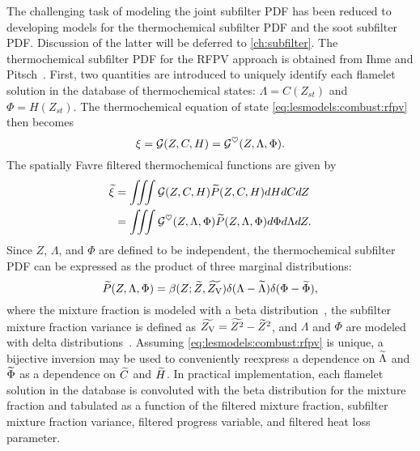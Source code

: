 The challenging task of modeling the joint subfilter PDF has been reduced to developing models for the thermochemical subfilter PDF and the soot subfilter PDF. Discussion of the latter will be deferred to \cref{ch:subfilter}. The thermochemical subfilter PDF for the RFPV approach is obtained from Ihme and Pitsch~\cite{ihme2008}. First, two quantities are introduced to uniquely identify each flamelet solution in the database of thermochemical states: $\Lambda = C(Z_{st})$ and $\Phi = H(Z_{st})$. The thermochemical equation of state \cref{eq:lesmodels:combust:rfpv} then becomes
\begin{equation}\label{eq:lesmodels:presumedpdf:eos}
  \xi = \mathcal{G}(Z, C, H) = \mathcal{G}^{\heartsuit}(Z, \Lambda, \Phi).
\end{equation}
The spatially Favre filtered thermochemical functions are given by
\begin{equation}\label{eq:lesmodels:presumedpdf:filteredeos}
  \begin{split}
    \widetilde{\xi} &= \iiint \mathcal{G}(Z,C,H)\widetilde{P}(Z,C,H) dHdCdZ \\
    &= \iiint \mathcal{G}^{\heartsuit}(Z,\Lambda,\Phi)\widetilde{P}(Z,\Lambda,\Phi) d\Phi d\Lambda dZ.
  \end{split}
\end{equation}
Since $Z$, $\Lambda$, and $\Phi$ are defined to be independent, the thermochemical subfilter PDF can be expressed as the product of three marginal distributions:
\begin{equation}\label{eq:lesmodels:presumedpdf:trimarg}
  \widetilde{P}(Z,\Lambda,\Phi) = \beta(Z;\widetilde{Z},\widetilde{Z_{\text{V}}})\delta(\Lambda - \widetilde{\Lambda})\delta(\Phi - \widetilde{\Phi}),
\end{equation}
where the mixture fraction is modeled with a beta distribution~\cite{cook1994,jimenez1997,wall2000}, the subfilter mixture fraction variance is defined as $\widetilde{Z_{\text{V}}} = \widetilde{Z^2} - \widetilde{Z}^2$, and $\Lambda$ and $\Phi$ are modeled with delta distributions~\cite{ihme2008}. Assuming \cref{eq:lesmodels:combust:rfpv} is unique, a bijective inversion may be used to conveniently reexpress a dependence on $\widetilde{\Lambda}$ and $\widetilde{\Phi}$ as a dependence on $\widetilde{C}$ and $\widetilde{H}$. In practical implementation, each flamelet solution in the database is convoluted with the beta distribution for the mixture fraction and tabulated as a function of the filtered mixture fraction, subfilter mixture fraction variance, filtered progress variable, and filtered heat loss parameter.

